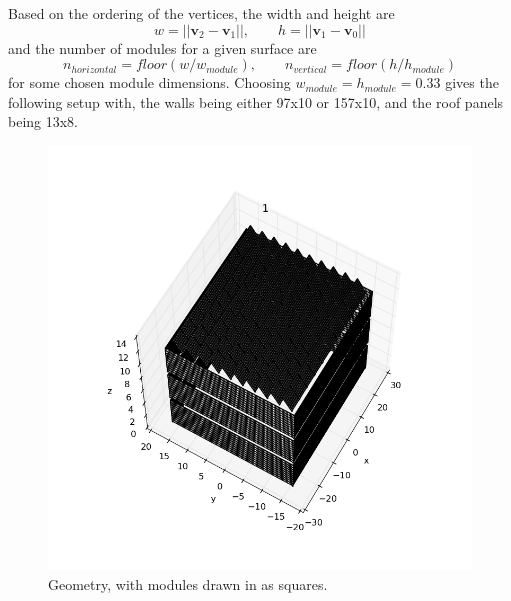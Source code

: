 \documentclass[11pt]{article}
\begin{document}
Based on the ordering of the vertices, the width and height are 
\[ w = ||\mathbf{v}_2-\mathbf{v}_1||, \qquad h = ||\mathbf{v}_1-\mathbf{v}_0||
\]
and the number of modules for a given surface are 
\[
n_{horizontal} = floor(w/w_{module}), \qquad n_{vertical} = floor(h/h_{module})
\]
for some chosen module dimensions. Choosing $w_{module} = h_{module} = 0.33$ gives the following setup with, the walls being either 97x10 or 157x10, and the roof panels being 13x8.

\begin{figure}
\centering
\includegraphics[width=1.0\textwidth]{images/whole-building-all.png}
\caption{Geometry, with modules drawn in as squares.}
\label{fig:normals}
\end{figure}
\end{document}
